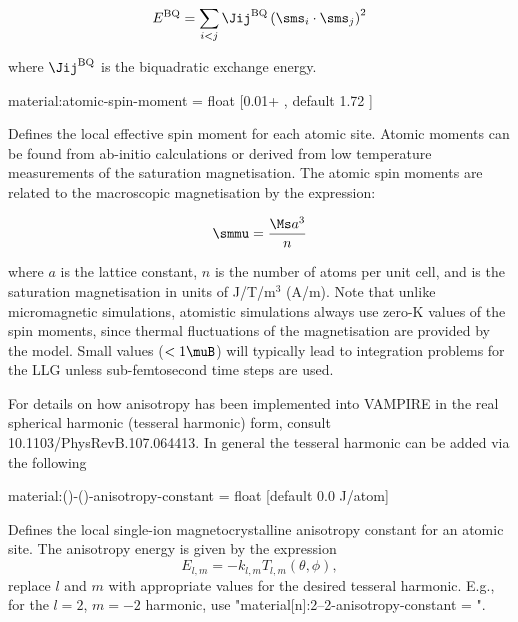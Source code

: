 \begin{equation*}
E^{\mathrm{BQ}} = \sum_{i<j} \Jij^{\mathrm{BQ}} \left( \sms_i \cdot \sms_j \right)^2
\end{equation*}

\noindent where $\Jij^{\mathrm{BQ}}$ is the biquadratic exchange energy.

{\zicf material:atomic-spin-moment = float [0.01+ \muB, default 1.72 \muB]} Defines the local effective spin moment for each atomic site. Atomic moments can be found from ab-initio calculations or derived from low temperature measurements of the saturation magnetisation. The atomic spin moments are related to the macroscopic magnetisation by the expression:

\begin{equation*}
\smmu = \frac{\Ms a^3}{n}
\end{equation*}

\noindent where $a$ is the lattice constant, $n$ is the number of atoms per unit cell, and \Ms is the saturation magnetisation in units of J/T/m$^3$ (A/m). Note that unlike micromagnetic simulations, atomistic simulations always use zero-K values of the spin moments, since thermal fluctuations of the magnetisation are provided by the model. Small values ($<1 \muB$) will typically lead to integration problems for the LLG unless sub-femtosecond time steps are used.

\noindent For details on how anisotropy has been implemented into VAMPIRE in the real spherical harmonic (tesseral harmonic) form, consult 10.1103/PhysRevB.107.064413.
\noindent In general the tesseral harmonic can be added via the following

{\zicf material:()-()-anisotropy-constant = float [default 0.0 J/atom]} Defines the local single-ion magnetocrystalline anisotropy constant for an atomic site. The anisotropy energy is given by the expression
\begin{equation*}
  E_{l,m} = -k_{l,m}T_{l,m}(\theta, \phi),
\end{equation*}
replace $l$ and $m$ with appropriate values for the desired tesseral harmonic.
E.g., for the $ l = 2 $, $ m = -2 $ harmonic, use "material[n]:2--2-anisotropy-constant = ".

